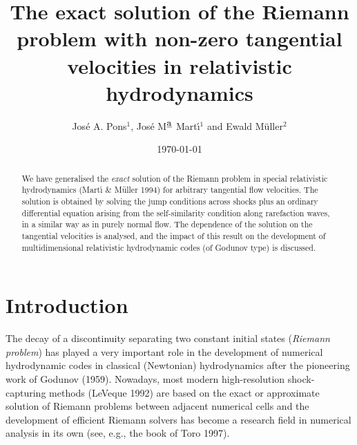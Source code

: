 \def\be{\begin{equation}}
\def\ee{\end{equation}}
\def\lb{\left[}
\def\rb{\right]}



\title
[Exact solution of the relativistic Riemann problem]
{The exact solution of the Riemann problem with non-zero
tangential velocities in relativistic hydrodynamics}

\author
[J.A. Pons, J. M$^{\underline{\mbox a}}$ Mart\'{\i} and E. M\"uller]
{Jos\'e A. Pons$^1$,  Jos\'e M$^{\underline{\mbox a}}$ Mart\'{\i}$^1$ 
and Ewald M\"uller$^2$}
              

\date{\today}

\maketitle

\begin{abstract}

  We have generalised the {\it exact} solution of the Riemann problem
in special relativistic hydrodynamics (Mart\'{\i} \& M\"uller 1994)
for arbitrary tangential flow velocities. The solution is obtained by
solving the jump conditions across shocks plus an ordinary
differential equation arising from the self-similarity condition along
rarefaction waves, in a similar way as in purely normal flow. The
dependence of the solution on the tangential velocities is analysed,
and the impact of this result on the development of multidimensional
relativistic hydrodynamic codes (of Godunov type) is discussed.

\end{abstract}

\section{Introduction}
\label{s:intro}

  The decay of a discontinuity separating two constant initial states
({\it Riemann problem}) has played a very important role in the
development of numerical hydrodynamic codes in classical (Newtonian)
hydrodynamics after the pioneering work of Godunov (1959). Nowadays,
most modern high-resolution shock-capturing methods (LeVeque 1992) are
based on the exact or approximate solution of Riemann problems between
adjacent numerical cells and the development of efficient Riemann
solvers has become a research field in numerical analysis in its own
(see, e.g., the book of Toro 1997).

